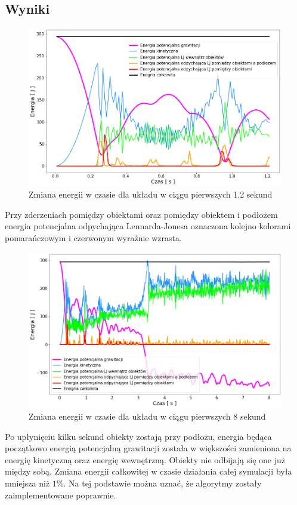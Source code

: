 \documentclass[12pt, letterpaper]{report}
\begin{document}
    \subsection{Wyniki}
    \begin{figure}[h]
        \centering
        \includegraphics[width=13cm]{energy_test_0to2s}
        \caption{Zmiana energii w czasie dla układu w ciągu pierwszych 1.2 sekund}
    \end{figure}

    Przy zderzeniach pomiędzy obiektami oraz pomiędzy obiektem i podłożem energia potencjalna
    odpychająca Lennarda-Jonesa oznaczona kolejno kolorami pomarańczowym i czerwonym
    wyraźnie wzrasta.
    \begin{figure}[h]
        \centering
        \includegraphics[width=13cm]{energy_test_0to8s}
        \caption{Zmiana energii w czasie dla układu w ciągu pierwszych 8 sekund}
    \end{figure}
    
    Po upłynięciu kilku sekund obiekty zostają przy podłożu, energia będąca początkowo energią
    potencjalną grawitacji została w większości zamieniona na energię kinetyczną oraz energię
    wewnętrzną. Obiekty nie odbijają się one już między sobą.
    Zmiana energii całkowitej w czasie działania całej symulacji była mniejsza niż $1\%$. Na tej
    podstawie można uznać, że algorytmy zostały zaimplementowane poprawnie.
\end{document}
